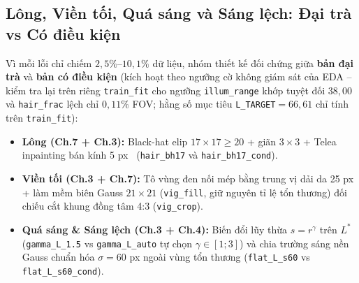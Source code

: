 \documentclass[10pt,twocolumn,a4paper]{article}
\begin{document}
\subsection{Lông, Viền tối, Quá sáng và Sáng lệch: Đại trà vs Có điều kiện}
Vì mỗi lỗi chỉ chiếm $2{,}5\%\text{--}10{,}1\%$ dữ liệu, nhóm thiết kế đối chứng giữa \textbf{bản đại trà} và \textbf{bản có điều kiện} (kích hoạt theo ngưỡng cờ không giám sát của EDA -- kiểm tra lại trên riêng \texttt{train\_fit} cho ngưỡng \texttt{illum\_range} khớp tuyệt đối $38{,}00$ và \texttt{hair\_frac} lệch chỉ $0{,}11\%$ FOV; hằng số mục tiêu \texttt{L\_TARGET}$=66{,}61$ chỉ tính trên \texttt{train\_fit}):
\begin{itemize}
    \item \textbf{Lông (Ch.7 + Ch.3):} Black-hat elip $17{\times}17 \ge 20$ + giãn $3{\times}3$ + Telea inpainting bán kính 5 px~\cite{lee1997dullrazor,telea2004inpainting} (\texttt{hair\_bh17} và \texttt{hair\_bh17\_cond}).
    \item \textbf{Viền tối (Ch.3 + Ch.7):} Tô vùng đen nối mép bằng trung vị dải da 25 px + làm mềm biên Gauss $21{\times}21$ (\texttt{vig\_fill}, giữ nguyên tỉ lệ tổn thương) đối chiếu cắt khung đồng tâm 4:3 (\texttt{vig\_crop}).
    \item \textbf{Quá sáng \& Sáng lệch (Ch.3 + Ch.4):} Biến đổi lũy thừa $s=r^\gamma$ trên $L^*$ (\texttt{gamma\_L\_1.5} vs \texttt{gamma\_L\_auto} tự chọn $\gamma \in [1;3]$) và chia trường sáng nền Gauss chuẩn hóa $\sigma=60$ px ngoài vùng tổn thương (\texttt{flat\_L\_s60} vs \texttt{flat\_L\_s60\_cond}).
\end{itemize}
\end{document}

